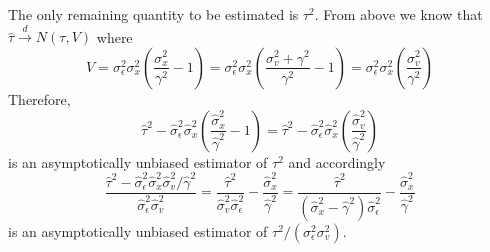 \documentclass[12pt]{article}
\theoremstyle{definition}
\begin{document}
 The only remaining quantity to be estimated is $\tau^2$. From above we know that $\widehat{\tau} \overset{d}{\rightarrow} N(\tau, V)$ where
    $$V = \sigma^2_\epsilon \sigma^2_x \left(\frac{\sigma^2_x}{\gamma^2} - 1 \right)  = \sigma^2_\epsilon \sigma^2_x \left(\frac{\sigma^2_v + \gamma^2}{\gamma^2} - 1 \right) =  \sigma^2_\epsilon \sigma^2_x \left( \frac{\sigma^2_v}{\gamma^2}\right)$$
Therefore,
  $$\widehat{\tau}^2 - \widehat{\sigma}_\epsilon^2\widehat{\sigma}_x^2  \left(\frac{\widehat{\sigma}_x^2}{\widehat{\gamma}^2} - 1 \right)= \widehat{\tau}^2 - \widehat{\sigma}_\epsilon^2\widehat{\sigma}_x^2 \left(\frac{\widehat{\sigma}_v^2}{\widehat{\gamma}^2}\right)$$
is an asymptotically unbiased estimator of $\tau^2$ and accordingly
  $$\frac{\widehat{\tau}^2 - \widehat{\sigma}_\epsilon^2\widehat{\sigma}_x^2 \widehat{\sigma}_v^2/\widehat{\gamma}^2}{\widehat{\sigma}_\epsilon^2 \widehat{\sigma}_v^2} = \frac{\widehat{\tau}^2}{\widehat{\sigma}_v^2 \widehat{\sigma}_\epsilon^2} - \frac{\widehat{\sigma}_x^2}{\widehat{\gamma}^2} =  \frac{\widehat{\tau}^2}{(\widehat{\sigma}_x^2 - \widehat{\gamma}^2) \widehat{\sigma}_\epsilon^2} - \frac{\widehat{\sigma}_x^2}{\widehat{\gamma}^2}$$
is an asymptotically unbiased estimator of $\tau^2/(\sigma_\epsilon^2 \sigma_v^2)$.
\end{document}
